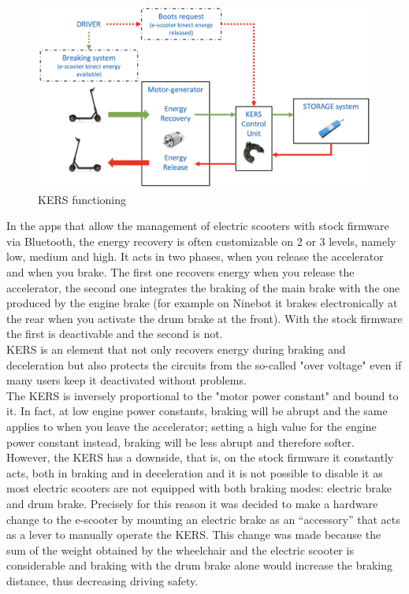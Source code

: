 \documentclass[binding=0.6cm,LaM,noexaminfo]{sapthesis}
\begin{document}
\begin{itemize}
    \begin{figure}[!htp]
    \centering
    \includegraphics[width = .9\textwidth]{images/kers.png}
    \caption{KERS functioning}
    \label{fig:my_label}
    \end{figure}
    
    \noindent In the  apps that allow the management of electric scooters with stock firmware via Bluetooth, the energy recovery is often customizable on 2 or 3 levels, namely low, medium and high. It acts in two phases, when you release the accelerator and when you brake. The first one recovers energy when you release the accelerator, the second one integrates the braking of the main brake with the one produced by the engine brake (for example on Ninebot it brakes electronically at the rear when you activate the drum brake at the front). With the stock firmware the first is deactivable and the second is not.\\ 
    KERS is an element that not only recovers energy during braking and deceleration but also protects the circuits from the so-called "over voltage" even if many users keep it deactivated without problems. \\
    The KERS is inversely proportional to the "motor power constant" and bound to it. In fact, at low engine power constants, braking will be abrupt and the same applies to when you leave the accelerator; setting a high value for the engine power constant instead, braking will be less abrupt and therefore softer.\\
    \noindent However, the KERS has a downside, that is, on the stock firmware it constantly acts, both in braking and in deceleration and it is not possible to disable it as most electric scooters are not equipped with both braking modes: electric brake and drum brake. Precisely for this reason it was decided to make a hardware change to the e-scooter by mounting an electric brake as an “accessory” that acts as a lever to manually operate the KERS. This change was made because the sum of the weight obtained by the wheelchair and the electric scooter is considerable and braking with the drum brake alone would increase the braking distance, thus decreasing driving safety.
    

\end{itemize}
\end{document}
